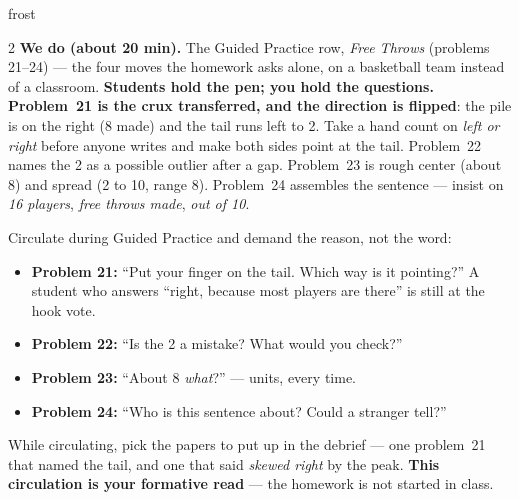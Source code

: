 \documentclass[10pt]{article}
\begin{document}
\begin{skillbox}{frost}
\begin{multicols}{2}
\columnbreak
\textbf{We do (about 20 min).} The Guided Practice row, \emph{Free Throws} (problems 21--24) ---
the four moves the homework asks alone, on a basketball team instead of a classroom.
\textbf{Students hold the pen; you hold the questions.} \textbf{Problem~21 is the crux
transferred, and the direction is flipped}: the pile is on the right (8 made) and the tail runs
left to 2. Take a hand count on \emph{left or right} before anyone writes and make both sides
point at the tail. Problem~22 names the 2 as a possible outlier after a gap. Problem~23 is rough
center (about 8) and spread (2 to 10, range 8). Problem~24 assembles the sentence --- insist on
\emph{16 players}, \emph{free throws made}, \emph{out of 10}.

Circulate during Guided Practice and demand the reason, not the word:
\begin{itemize}[leftmargin=1.1em, nosep]
  \item \textbf{Problem 21:} ``Put your finger on the tail. Which way is it pointing?'' A student
        who answers ``right, because most players are there'' is still at the hook vote.
  \item \textbf{Problem 22:} ``Is the 2 a mistake? What would you check?''
  \item \textbf{Problem 23:} ``About 8 \emph{what}?'' --- units, every time.
  \item \textbf{Problem 24:} ``Who is this sentence about? Could a stranger tell?''
\end{itemize}
While circulating, pick the papers to put up in the debrief --- one problem~21 that named the
tail, and one that said \emph{skewed right} by the peak. \textbf{This circulation is your
formative read} --- the homework is not started in class.
\end{multicols}
\end{skillbox}
\end{document}

